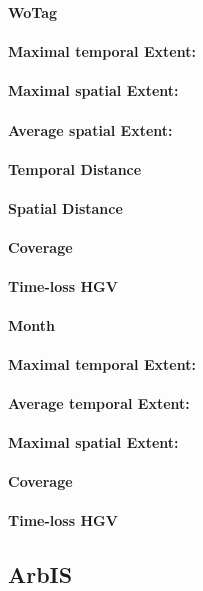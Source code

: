 \large
\centerline{\textbf{WoTag}}
\normalsize

\paragraph{Maximal temporal Extent:}
\paragraph{Maximal spatial Extent:}
\paragraph{Average spatial Extent:}
\paragraph{Temporal Distance}
\paragraph{Spatial Distance}
\paragraph{Coverage}
\paragraph{Time-loss HGV}

\large
\centerline{\textbf{Month}}
\normalsize

\paragraph{Maximal temporal Extent:}
\paragraph{Average temporal Extent:}
\paragraph{Maximal spatial Extent:}
\paragraph{Coverage}
\paragraph{Time-loss HGV}

\subsection{ArbIS}

